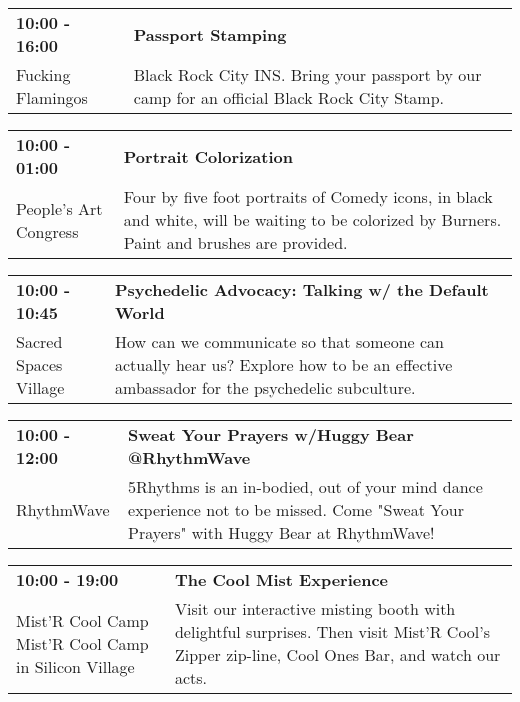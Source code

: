 \begin{tabular}{ p{1in} p{2.2in} }
    \textbf{10:00 - 16:00} & \textbf{Passport Stamping} \\
    Fucking Flamingos \newline  & Black Rock City INS. Bring your passport by our camp for an official Black Rock City Stamp. \\
    \hline 
\end{tabular}
    
\begin{tabular}{ p{1in} p{2.2in} }
    \textbf{10:00 - 01:00} & \textbf{Portrait Colorization} \\
    People's Art Congress \newline  & Four by five foot portraits of Comedy icons, in black and white, will be waiting to be colorized by Burners. Paint and brushes are provided. \\
    \hline 
\end{tabular}
    
\begin{tabular}{ p{1in} p{2.2in} }
    \textbf{10:00 - 10:45} & \textbf{Psychedelic Advocacy: Talking w/ the Default World} \\
    Sacred Spaces Village \newline  & How can we communicate so that someone can actually hear us? Explore how to be an effective ambassador for the psychedelic subculture. \\
    \hline 
\end{tabular}
    
\begin{tabular}{ p{1in} p{2.2in} }
    \textbf{10:00 - 12:00} & \textbf{Sweat Your Prayers w/Huggy Bear @RhythmWave} \\
    RhythmWave \newline  & 5Rhythms is an in-bodied, out of your mind dance experience not to be missed. Come "Sweat Your Prayers" with Huggy Bear at RhythmWave! \\
    \hline 
\end{tabular}
    
\begin{tabular}{ p{1in} p{2.2in} }
    \textbf{10:00 - 19:00} & \textbf{The Cool Mist Experience} \\
    Mist'R Cool Camp \newline Mist'R Cool Camp in Silicon Village & Visit our interactive misting booth with delightful surprises. Then visit Mist'R Cool's Zipper zip-line, Cool Ones Bar, and watch our acts. \\
    \hline 
\end{tabular}
    
